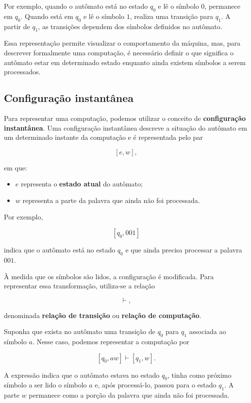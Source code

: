 \documentclass[
  brazilian,
  letterpaper,
]{book}
\providecommand{\tightlist}{%
  \setlength{\itemsep}{0pt}\setlength{\parskip}{0pt}}
\theoremstyle{plain}
\theoremstyle{definition}
\theoremstyle{remark}
\begin{document}
Por exemplo, quando o autômato está no estado \(q_0\) e lê o símbolo
\(0\), permanece em \(q_0\). Quando está em \(q_0\) e lê o símbolo
\(1\), realiza uma transição para \(q_1\). A partir de \(q_1\), as
transições dependem dos símbolos definidos no autômato.

Essa representação permite visualizar o comportamento da máquina, mas,
para descrever formalmente uma computação, é necessário definir o que
significa o autômato estar em determinado estado enquanto ainda existem
símbolos a serem processados.

\subsection{Configuração
instantânea}\label{configurauxe7uxe3o-instantuxe2nea}

Para representar uma computação, podemos utilizar o conceito de
\textbf{configuração instantânea}. Uma configuração instantânea descreve
a situação do autômato em um determinado instante da computação e é
representada pelo par

\[
[e,w],
\]

em que:

\begin{itemize}
\tightlist
\item
  \(e\) representa o \textbf{estado atual} do autômato;
\item
  \(w\) representa a parte da palavra que ainda não foi processada.
\end{itemize}

Por exemplo,

\[
[q_0,001]
\]

indica que o autômato está no estado \(q_0\) e que ainda precisa
processar a palavra \(001\).

À medida que os símbolos são lidos, a configuração é modificada. Para
representar essa transformação, utiliza-se a relação

\[
\vdash,
\]

denominada \textbf{relação de transição} ou \textbf{relação de
computação}.

Suponha que exista no autômato uma transição de \(q_0\) para \(q_1\)
associada ao símbolo \(a\). Nesse caso, podemos representar a computação
por

\[
[q_0,aw]\vdash[q_1,w].
\]

A expressão indica que o autômato estava no estado \(q_0\), tinha como
próximo símbolo a ser lido o símbolo \(a\) e, após processá-lo, passou
para o estado \(q_1\). A parte \(w\) permanece como a porção da palavra
que ainda não foi processada.
\end{document}
